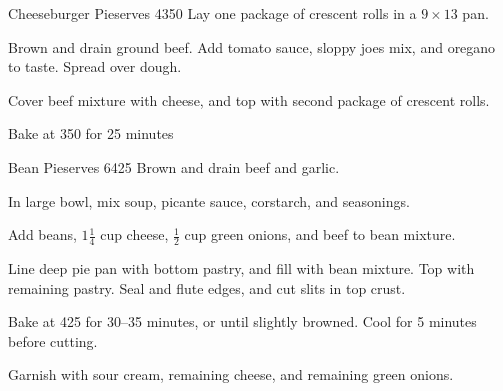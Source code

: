 
\begin{recipe}{Cheeseburger Pie}{serves 4}{350\0}
    Lay one package of crescent rolls in a $9 \times 13$ pan.

    Brown and drain ground beef. Add tomato sauce, sloppy joes mix, and oregano to taste. Spread over dough.

    Cover beef mixture with cheese, and top with second package of crescent rolls.

    \newstep
    Bake at 350\0 for 25 minutes
\end{recipe}

\begin{recipe}{Bean Pie}{serves 6}{425\0}
    Brown and drain beef and garlic.

    In large bowl, mix soup, picante sauce, corstarch, and seasonings.

    Add beans, $1\frac{1}{4}$ cup cheese, $\frac{1}{2}$ cup green onions, and beef to bean mixture.

    Line deep pie pan with bottom pastry, and fill with bean mixture. Top with remaining pastry. Seal and flute edges, and cut slits in top crust.

    \newstep
    Bake at 425\0 for 30--35 minutes, or until slightly browned. Cool for 5 minutes before cutting.

    \newstep
    Garnish with sour cream, remaining cheese, and remaining green onions.
\end{recipe}
